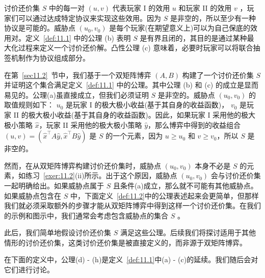 讨价还价集 \(S\) 中的每一对 $(u, v)$ 代表玩家 \(\mathrm{I}\) 的效用 \(u\) 和玩家 II 的效用 \(v\) ，玩家们可以通过达成特定协议来实现这些效用。因为 \(S\) 是非空的，所以至少有一种协议是可能的。威胁点 \(\left( {{u}_{0},{v}_{0}}\right)\) 是每个玩家(在期望意义上)可以为自己保底的效用对。定义~\ref{def:11.1} 中的公理 (b) 表明 \(S\) 是有界且闭的，其目的是通过某种最大化过程来定义一个讨价还价解。凸性公理 (c) 意味着，必要时玩家可以将联合抽签机制作为协议组成部分。

在第~\ref{sec11.2}~节中，我们基于一个双矩阵博弈 $(A,B)$ 构建了一个讨价还价集 \(S\) 并证明这个集合满足定义~\ref{def:11.1} 中的公理。其中公理 (b) 和 (c) 的成立是显而易见的。公理(a)虽直接成立，但我们必须证明 \(S\) 是非空的。威胁点 \(\left( {{u}_{0},{v}_{0}}\right)\) 的取值规则如下： \({u}_{0}\) 是玩家 I 的极大极小收益(基于其自身的收益函数)， \({v}_{0}\) 是玩家 II 的极大极小收益(基于其自身的收益函数)。因此，如果玩家 I 采用他的极大极小策略 \(\widehat{x}\)，玩家 II 采用他的极大极小策略 \(\widehat{y}\)，那么博弈中得到的收益组合 \(\left( {u,v}\right)  = \left( {{\widehat{x}}^{\top }A\widehat{y},{\widehat{x}}^{\top }B\widehat{y}}\right)\) 是 \(S\) 的一个元素，因为 \(u \geq  {u}_{0}\) 和 \(v \geq  {v}_{0}\)，所以 \(S\) 是非空的。

然而，在从双矩阵博弈构建讨价还价集时，威胁点 \(\left( {{u}_{0},{v}_{0}}\right)\) 本身不必是 \(S\) 的元素，如练习~\ref{exer:11.2}(ii)所示。出于这个原因，威胁点 \(\left( {{u}_{0},{v}_{0}}\right)\) 会与讨价还价集一起明确给出。如果威胁点属于 \(S\) 且条件(a)成立，那么就不可能有其他威胁点。如果威胁点包含在 \(S\) 中，下面定义~\ref{def:11.2}中的公理表述起来会更简单，但那样我们就必须采取额外的步骤才能从双矩阵博弈中得到这样一个讨价还价集。在我们的示例和图示中，我们通常会考虑包含威胁点的集合 \(S\) 。

此后，我们简单地假设讨价还价集 \(S\) 满足这些公理。后续我们将探讨适用于其他情形的讨价还价集，这类讨价还价集是被直接定义的，而非源于双矩阵博弈。

在下面的定义中，公理(d) - (h)是定义~\ref{def:11.1}中(a) - (c)的延续。我们随后会对它们进行讨论。

